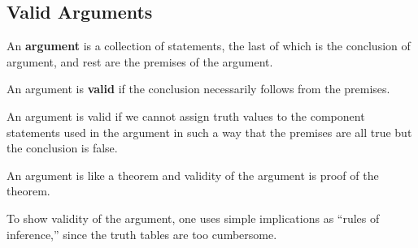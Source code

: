 \documentclass[a4paper,english,12pt]{article}
\begin{document}
\subsection{Valid Arguments}
\begin{defn}[Argument] An \textbf{argument} is a collection of statements, the last of which is the conclusion of argument, and rest are the premises of the argument.
\end{defn}
\begin{defn}[Validity] An argument is \textbf{valid} if the conclusion necessarily follows from the premises.
\end{defn}
\begin{rem} An argument is valid if we cannot assign truth values to the component statements used in the argument in such a way that the premises are all true but the conclusion is false.
\end{rem}
\begin{rem} An argument is like a theorem and validity of the argument is proof of the theorem.
\end{rem}
\begin{rem} To show validity of the argument, one uses simple implications as ``rules of inference,'' since the truth tables are too cumbersome.
\end{rem}
\end{document}
